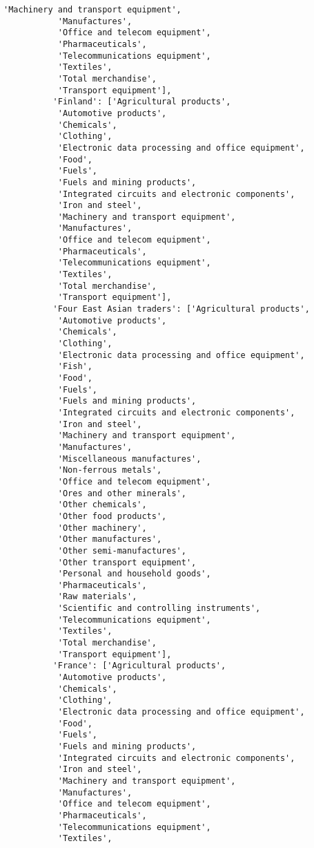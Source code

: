 \documentclass[11pt]{article}
\begin{document}
\begin{Verbatim}[commandchars=\\\{\}]
           'Machinery and transport equipment',
           'Manufactures',
           'Office and telecom equipment',
           'Pharmaceuticals',
           'Telecommunications equipment',
           'Textiles',
           'Total merchandise',
           'Transport equipment'],
          'Finland': ['Agricultural products',
           'Automotive products',
           'Chemicals',
           'Clothing',
           'Electronic data processing and office equipment',
           'Food',
           'Fuels',
           'Fuels and mining products',
           'Integrated circuits and electronic components',
           'Iron and steel',
           'Machinery and transport equipment',
           'Manufactures',
           'Office and telecom equipment',
           'Pharmaceuticals',
           'Telecommunications equipment',
           'Textiles',
           'Total merchandise',
           'Transport equipment'],
          'Four East Asian traders': ['Agricultural products',
           'Automotive products',
           'Chemicals',
           'Clothing',
           'Electronic data processing and office equipment',
           'Fish',
           'Food',
           'Fuels',
           'Fuels and mining products',
           'Integrated circuits and electronic components',
           'Iron and steel',
           'Machinery and transport equipment',
           'Manufactures',
           'Miscellaneous manufactures',
           'Non-ferrous metals',
           'Office and telecom equipment',
           'Ores and other minerals',
           'Other chemicals',
           'Other food products',
           'Other machinery',
           'Other manufactures',
           'Other semi-manufactures',
           'Other transport equipment',
           'Personal and household goods',
           'Pharmaceuticals',
           'Raw materials',
           'Scientific and controlling instruments',
           'Telecommunications equipment',
           'Textiles',
           'Total merchandise',
           'Transport equipment'],
          'France': ['Agricultural products',
           'Automotive products',
           'Chemicals',
           'Clothing',
           'Electronic data processing and office equipment',
           'Food',
           'Fuels',
           'Fuels and mining products',
           'Integrated circuits and electronic components',
           'Iron and steel',
           'Machinery and transport equipment',
           'Manufactures',
           'Office and telecom equipment',
           'Pharmaceuticals',
           'Telecommunications equipment',
           'Textiles',

\end{Verbatim}
\end{document}
